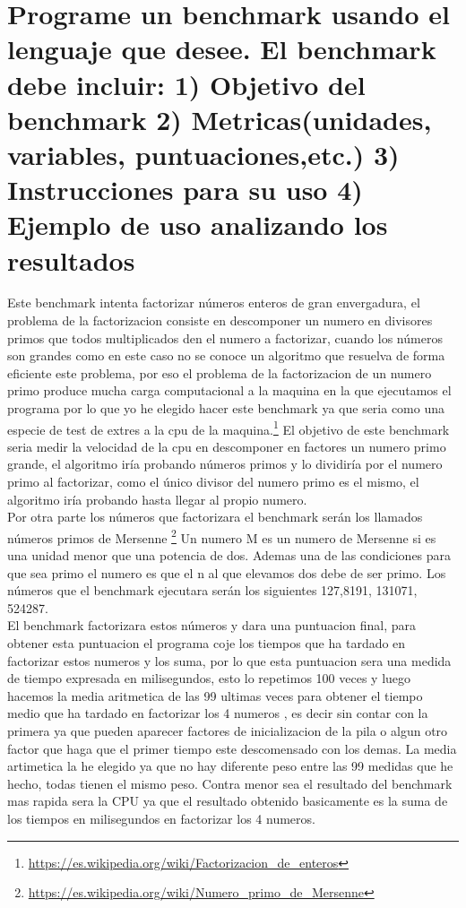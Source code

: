 \section{Programe un benchmark usando el lenguaje que desee. El benchmark debe incluir: 1) Objetivo del benchmark 2) Metricas(unidades, variables, puntuaciones,etc.) 3) Instrucciones para su uso 4) Ejemplo de uso analizando los resultados }
Este benchmark intenta factorizar números enteros de gran envergadura, el problema de la factorizacion consiste en descomponer un numero en divisores primos que todos multiplicados den el numero a factorizar, cuando los números son grandes como en este caso no se conoce un algoritmo que resuelva de forma eficiente este problema, por eso el problema de la factorizacion de un numero primo produce mucha carga computacional a la maquina en la que ejecutamos el programa por lo que yo he elegido hacer este benchmark ya que seria como una especie de test de extres a la cpu de la maquina.\footnote{\url{https://es.wikipedia.org/wiki/Factorizacion_de_enteros}}
El objetivo de este benchmark seria medir la velocidad de la cpu en descomponer en factores un numero primo grande, el algoritmo iría probando números primos y lo dividiría por el numero primo al factorizar, como el único divisor del numero primo es el mismo, el algoritmo iría probando hasta llegar al propio numero.\\ Por otra parte los números que factorizara el benchmark serán los llamados números primos de Mersenne \footnote{\url{https://es.wikipedia.org/wiki/Numero_primo_de_Mersenne}}
Un numero M es un numero de Mersenne si es una unidad menor que una potencia de dos. Ademas una de las condiciones para que sea primo el numero es que el n al que elevamos dos debe de ser primo.
Los números que el benchmark ejecutara serán los siguientes
127,8191, 131071, 524287. \\El benchmark factorizara estos números y dara una puntuacion final, para obtener esta puntuacion el programa coje los tiempos que ha tardado en factorizar estos numeros y los suma, por lo que esta puntuacion sera una medida de tiempo expresada en milisegundos, esto lo repetimos 100 veces y luego hacemos la media aritmetica de las 99 ultimas veces para obtener el tiempo medio que ha tardado en factorizar los 4 numeros , es decir sin contar con la primera ya que pueden aparecer factores de inicializacion de la pila o algun otro factor que haga que el primer tiempo este descomensado con los demas. La media artimetica la he elegido ya que no hay diferente peso entre las 99 medidas que he hecho, todas tienen el mismo peso. Contra menor sea el resultado del benchmark mas rapida sera la CPU ya que el resultado obtenido basicamente es la suma de los tiempos en milisegundos en factorizar los 4 numeros.
